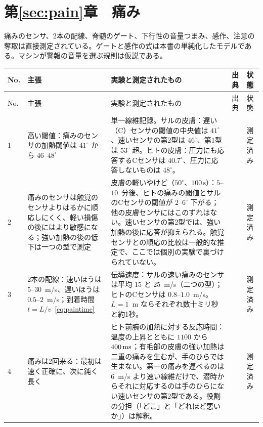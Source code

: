 \section{第\ref{sec:pain}章　痛み}

痛みのセンサ、2本の配線、脊髄のゲート、下行性の音量つまみ、感作、注意の奪取は直接測定されている。ゲートと感作の式は本書の単純化したモデルである。マシンが警報の音量を選ぶ規則は仮説である。

{\footnotesize
\setlength{\tabcolsep}{3pt}\renewcommand{\arraystretch}{1.15}
\begin{longtable}{>{\raggedright}p{0.5cm}>{\raggedright}p{4.0cm}>{\raggedright}p{5.6cm}>{\raggedright}p{2.3cm}>{\raggedright\arraybackslash}p{1.7cm}}
\toprule
No. & 主張 & 実験と測定されたもの & 出典 & 状態 \\
\midrule\endfirsthead
\toprule
No. & 主張 & 実験と測定されたもの & 出典 & 状態 \\
\midrule\endhead
1 & 高い閾値：痛みのセンサの加熱閾値は $41^\circ$ から $46$--$48^\circ$ & 単一線維記録。サルの皮膚：遅い（C）センサの閾値の中央値は $41^\circ$、速いセンサの第2型は $46^\circ$、第1型は $53^\circ$ 超。ヒトの皮膚：圧力にも応答するCセンサは $40.7^\circ$、圧力に応答しないものは $48^\circ$。 & \cite{Treede1995heat, Weidner1999cfib} & 測定済み \\
2 & 痛みのセンサは触覚のセンサよりはるかに順応しにくく、軽い損傷の後にはより敏感になる；強い加熱の後の低下は一つの型で測定 & 皮膚の軽いやけど（$50^\circ$、$100\,\text{s}$）：$5$--$10$~分後、ヒトの痛みの閾値とサルのCセンサの閾値が $2$--$6^\circ$ 下がる；他の皮膚センサにはこのずれはない。速いセンサの第2型では、強い加熱の後に応答が抑えられる。触覚センサとの順応の比較は一般的な推定で、ここでは個別の実験で裏づけられていない。 & \cite{LaMotte1982hyper, Treede1995heat} & 測定済み \\
3 & 2本の配線：速いほうは $5$--$30$~m/s、遅いほうは $0.5$--$2$~m/s；到着時間 $t=L/v$~\eqref{eq:paintime} & 伝導速度：サルの速い痛みのセンサは平均 $15$ と $25$~m/s（二つの型）；ヒトのCセンサは $0.8$--$1.0$~m/s。$L=1$~m ならそれぞれ数十ミリ秒と約1秒。 & \cite{Treede1995heat, Weidner1999cfib} & 測定済み \\
4 & 痛みは2回来る：最初は速く正確に、次に鈍く長く & ヒト前腕の加熱に対する反応時間：温度の上昇とともに $1100$ から $400\,\text{ms}$；有毛部の皮膚の強い加熱は二重の痛みを生むが、手のひらでは生まない。第一の痛みを運べるのは $6$~m/s より速い線維だけで、潜時からそれに対応するのは手のひらにない速いセンサの第2型である。役割の分担（「どこ」と「どれほど悪いか」）は解釈。 & \cite{CampbellLaMotte1983first, Treede1995heat} & 測定済み \\

\end{longtable}}
